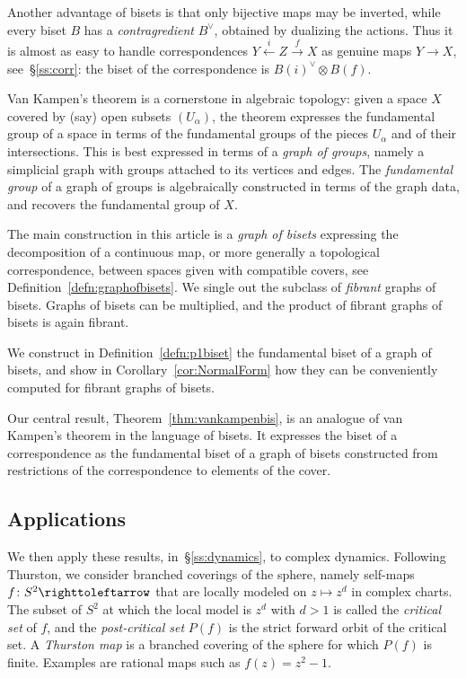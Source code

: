 \documentclass{amsart}
\begin{document}
Another advantage of bisets is that only bijective maps may be
inverted, while every biset $B$ has a \emph{contragredient} $B^\vee$,
obtained by dualizing the actions. Thus it is almost as easy to handle
correspondences $Y\overset{i}\leftarrow Z\overset{f}\rightarrow X$ as
genuine maps $Y\to X$, see~\S\ref{ss:corr}: the biset of the
correspondence is $B(i)^\vee\otimes B(f)$.

Van Kampen's theorem is a cornerstone in algebraic topology: given a space
$X$ covered by (say) open subsets $(U_\alpha)$, the theorem expresses the
fundamental group of a space in terms of the fundamental groups of the
pieces $U_\alpha$ and of their intersections. This is best expressed in
terms of a \emph{graph of groups}, namely a simplicial graph with groups
attached to its vertices and edges. The \emph{fundamental group} of a graph
of groups is algebraically constructed in terms of the graph data, and
recovers the fundamental group of $X$.

The main construction in this article is a \emph{graph of bisets}
expressing the decomposition of a continuous map, or more generally a
topological correspondence, between spaces given with compatible covers,
see Definition~\ref{defn:graphofbisets}. We single out the subclass of
\emph{fibrant} graphs of bisets. Graphs of bisets can be multiplied, and
the product of fibrant graphs of bisets is again fibrant.

We construct in Definition~\ref{defn:p1biset} the fundamental biset of a
graph of bisets, and show in Corollary~\ref{cor:NormalForm} how they can
be conveniently computed for fibrant graphs of bisets.

Our central result, Theorem~\ref{thm:vankampenbis}, is an analogue of van
Kampen's theorem in the language of bisets. It expresses the biset of a
correspondence as the fundamental biset of a graph of bisets constructed
from restrictions of the correspondence to elements of the cover.

\subsection{Applications}
We then apply these results, in~\S\ref{ss:dynamics}, to complex
dynamics. Following Thurston, we consider branched coverings of the
sphere, namely self-maps $f\colon S^2\righttoleftarrow$ that are
locally modeled on $z\mapsto z^d$ in complex charts. The subset of
$S^2$ at which the local model is $z^d$ with $d>1$ is called the
\emph{critical set} of $f$, and the \emph{post-critical set} $P(f)$ is
the strict forward orbit of the critical set. A \emph{Thurston map} is
a branched covering of the sphere for which $P(f)$ is finite. Examples
are rational maps such as $f(z)=z^2-1$.
\end{document}

